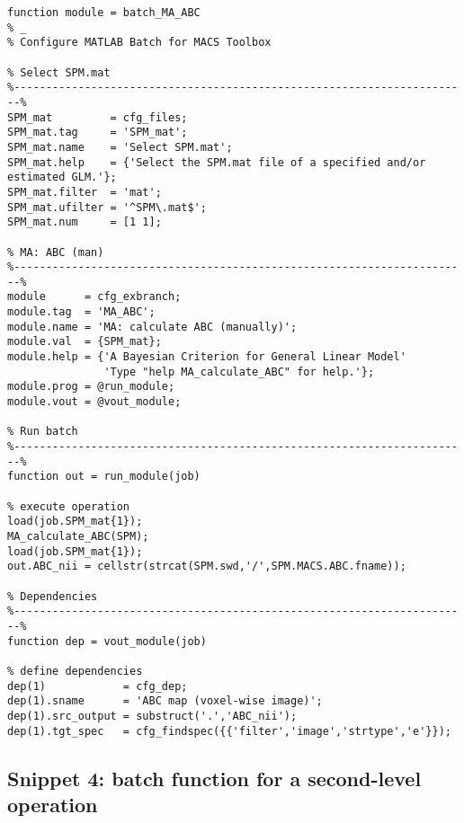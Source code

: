\documentclass[a4paper,12pt]{article}
\begin{document}
\vspace{1em}
\begin{verbatim}
function module = batch_MA_ABC
% _
% Configure MATLAB Batch for MACS Toolbox

% Select SPM.mat
%-----------------------------------------------------------------------%
SPM_mat         = cfg_files;
SPM_mat.tag     = 'SPM_mat';
SPM_mat.name    = 'Select SPM.mat';
SPM_mat.help    = {'Select the SPM.mat file of a specified and/or estimated GLM.'};
SPM_mat.filter  = 'mat';
SPM_mat.ufilter = '^SPM\.mat$';
SPM_mat.num     = [1 1];

% MA: ABC (man)
%-----------------------------------------------------------------------%
module      = cfg_exbranch;
module.tag  = 'MA_ABC';
module.name = 'MA: calculate ABC (manually)';
module.val  = {SPM_mat};
module.help = {'A Bayesian Criterion for General Linear Model'
               'Type "help MA_calculate_ABC" for help.'};
module.prog = @run_module;
module.vout = @vout_module;

% Run batch
%-----------------------------------------------------------------------%
function out = run_module(job)

% execute operation
load(job.SPM_mat{1});
MA_calculate_ABC(SPM);
load(job.SPM_mat{1});
out.ABC_nii = cellstr(strcat(SPM.swd,'/',SPM.MACS.ABC.fname));

% Dependencies
%-----------------------------------------------------------------------%
function dep = vout_module(job)

% define dependencies
dep(1)            = cfg_dep;
dep(1).sname      = 'ABC map (voxel-wise image)';
dep(1).src_output = substruct('.','ABC_nii');
dep(1).tgt_spec   = cfg_findspec({{'filter','image','strtype','e'}});
\end{verbatim}


\pagebreak
\subsection*{Snippet 4: batch function for a second-level operation} \label{sec:DEF-batch}
\end{document}
